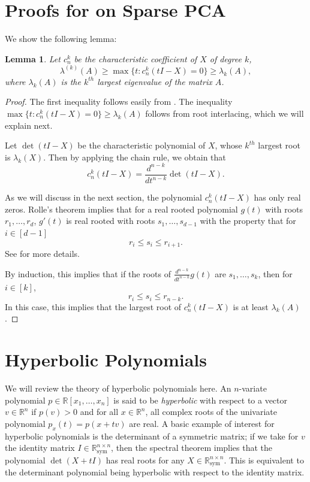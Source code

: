 \documentclass{amsart}
\newtheorem{lemma}[theorem]{Lemma}
\theoremstyle{definition}
\newcommand{\R}{\mathbb{R}}
\newcommand*{\Sym}{\R^{n \times n}_{\mathrm{sym}}}
\begin{document}
\section{Proofs for  on Sparse PCA}
We show the following lemma:
\begin{lemma}
    Let $c_n^k$ be the characteristic coefficient of $X$ of degree $k$,
    \[
        \lambda^{(k)}(A) \ge \max \{ t : c_n^k(t I - X) = 0\} \ge \lambda_k(A),
    \]
    where $\lambda_k(A)$ is the $k^{th}$ largest eigenvalue of the matrix $A$.
\end{lemma}
\begin{proof}
    The first inequality follows easily from . The inequality $\max \{ t : c_n^k(t I - X) = 0\} \ge \lambda_k(A)$ follows from root interlacing, which we will explain next.

    Let $\det(tI - X)$ be the characteristic polynomial of $X$, whose $k^{th}$ largest root is $\lambda_{k}(X)$. Then by applying the chain rule, we obtain that
    \[
        c_n^k(t I - X) = \frac{d^{n-k}}{dt^{n-k}}\det(tI - X).
    \]

    As we will discuss in the next section, the polynomial $c_n^k(tI-X)$ has only real zeros.
    Rolle's theorem implies that for a real rooted polynomial $g(t)$ with roots $r_1, \dots, r_d$, $g'(t)$ is real rooted with roots $s_1, \dots, s_{d-1}$ with the property that for $i \in [d-1]$
    \[
        r_i \le s_i \le r_{i+1}.
    \]
    See \cite{kummer2015hyperbolic} for more details.

    By induction, this implies that if the roots of $\frac{d^{n-k}}{dt^{n-k}}g(t)$ are $s_1, \dots, s_{k}$, then for $i \in [k]$,
    \[
        r_i \le s_i \le r_{n-k}.
    \]
    In this case, this implies that the largest root of $c_n^k(t I -X)$ is at least $\lambda_k(A)$.
\end{proof}
\section{Hyperbolic Polynomials}
\label{sec:hyperbolic}
We will review the theory of hyperbolic polynomials here.
An $n$-variate polynomial $p \in \R[x_1 ,\dots, x_n]$ is said to be \emph{hyperbolic} with respect to a vector $v \in \R^n$ if $p(v) > 0$ and for all $x \in \R^n$, all complex roots of the univariate polynomial $p_x(t) = p(x + tv)$ are real.
A basic example of interest for hyperbolic polynomials is the determinant of a symmetric matrix; if we take for $v$ the identity matrix $I \in \Sym$, then the spectral theorem implies that the polynomial $\det(X + tI)$ has real roots for any $X \in \Sym$.
This is equivalent to the determinant polynomial being hyperbolic with respect to the identity matrix.
\end{document}
